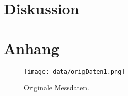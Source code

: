 \section{Diskussion}
\label{sec:Diskussion}


\printbibliography{}

\section*{Anhang}
\label{sec:anhang}

\begin{figure}[H]
    \centering
    \texttt{[image: data/origDaten1.png]}
    \caption{Originale Messdaten.}
    \label{fig:origDaten1}
\end{figure}

